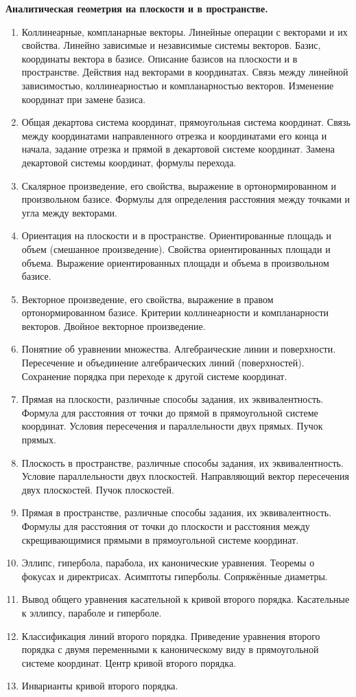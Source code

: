 \textbf{Аналитическая геометрия на плоскости и в пространстве.}
\begin{enumerate}
    \item Коллинеарные, компланарные векторы. Линейные операции с векторами и их свойства. Линейно зависимые и независимые системы векторов. Базис, координаты вектора в базисе. Описание базисов на плоскости и в пространстве. Действия над векторами в координатах. Связь между линейной зависимостью, коллинеарностью и компланарностью векторов. Изменение координат при замене базиса.
    \item Общая декартова система координат, прямоугольная система координат. Связь между координатами направленного отрезка и координатами его конца и начала, задание отрезка и прямой в декартовой системе координат. Замена декартовой системы координат, формулы перехода.
    \item Скалярное произведение, его свойства, выражение в ортонормированном и произвольном базисе. Формулы для определения расстояния между точками и угла между векторами.
    \item Ориентация на плоскости и в пространстве. Ориентированные площадь и объем (смешанное произведение). Свойства ориентированных площади и объема. Выражение ориентированных площади и объема в произвольном базисе.
    \item Векторное произведение, его свойства, выражение в правом ортонормированном базисе. Критерии коллинеарности и компланарности векторов. Двойное векторное произведение.
    \item Понятние об уравнении множества. Алгебраические линии и поверхности. Пересечение и объединение алгебраических линий (поверхностей). Сохранение порядка при переходе к другой системе координат.
    \item Прямая на плоскости, различные способы задания, их эквивалентность. Формула для расстояния от точки до прямой в прямоугольной системе координат. Условия пересечения и параллельности двух прямых. Пучок прямых.
    \item Плоскость в пространстве, различные способы задания, их эквивалентность. Условие параллельности двух плоскостей. Направляющий вектор пересечения двух плоскостей. Пучок плоскостей.
    \item Прямая в пространстве, различные способы задания, их эквивалентность. Формулы для расстояния от точки до плоскости и расстояния между скрещивающимися прямыми в прямоугольной системе координат.
    \item Эллипс, гипербола, парабола, их канонические уравнения. Теоремы о фокусах и директрисах. Асимптоты гиперболы. Сопряжённые диаметры.
    \item Вывод общего уравнения касательной к кривой второго порядка. Касательные к эллипсу, параболе и гиперболе.
    \item Классификация линий второго порядка. Приведение уравнения второго порядка с двумя переменными к каноническому виду в прямоугольной системе координат. Центр кривой второго порядка.
    \item Инварианты кривой второго порядка.
\end{enumerate}

